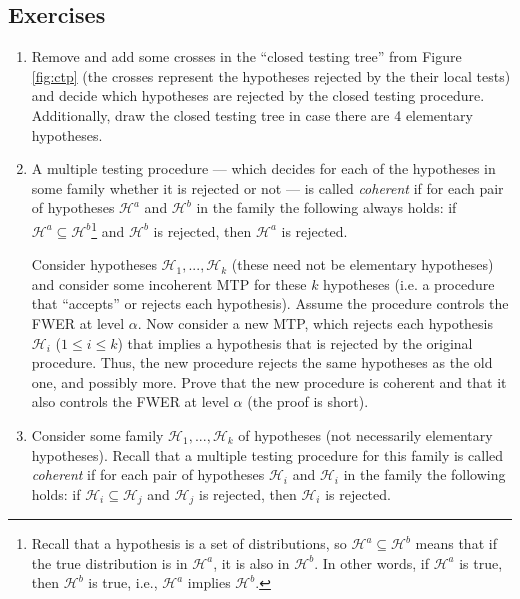 \documentclass[11pt]{article}
\theoremstyle{plain}
\theoremstyle{definition}
\newcommand{\Hy}{\mathcal{H}}
\begin{document}
\subsection{Exercises}
\begin{enumerate}


\item Remove and add some crosses in the ``closed testing tree'' from Figure \ref{fig:ctp} (the crosses represent the hypotheses rejected by the their local tests) and decide which hypotheses are rejected by the closed testing procedure. Additionally, draw the closed testing tree in case there are 4 elementary hypotheses.


\item  A multiple testing procedure --- which decides for each of the hypotheses in some family whether it is rejected or not --- is called \emph{coherent} if for each pair of hypotheses $\Hy^a$ and $\Hy^b$ in the family the following always holds: if $\Hy^a\subseteq \Hy^b$\footnote{Recall that a hypothesis is a set of distributions, so $\Hy^a\subseteq \Hy^b$ means that if the true distribution is in $\Hy^a$, it is also in $\Hy^b$. In other words, if $\Hy^a$ is true, then $\Hy^b$ is true, i.e., $\Hy^a$ implies $\Hy^b$.} and $\Hy^b$ is rejected, then $\Hy^a$ is rejected.

Consider hypotheses $\Hy_1,...,\Hy_k$ (these need not be elementary hypotheses) and consider some incoherent MTP for these $k$ hypotheses (i.e. a procedure that ``accepts'' or rejects each hypothesis). Assume the procedure controls the FWER at level $\alpha$. Now consider a new MTP, which rejects each hypothesis $\Hy_i$ ($1\leq i \leq k$) that implies a hypothesis that is rejected by the original procedure. Thus, the new procedure rejects the same hypotheses as the old one, and possibly more. Prove that the new procedure is coherent   and that it also controls the FWER at level $\alpha$  (the proof is short). 


\item  

Consider some family $\Hy_1,...,\Hy_k$ of hypotheses (not necessarily elementary hypotheses).  Recall that a multiple testing procedure for this family  is called \emph{coherent} if for each pair of hypotheses $\Hy_i$ and $\Hy_i$ in the family the following holds: if 
$\Hy_i\subseteq \Hy_j$  
 and $\Hy_j$ is rejected, then $\Hy_i$ is rejected. 
 

\end{enumerate}
\end{document}
